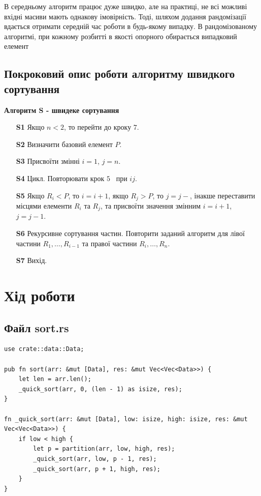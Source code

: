 \documentclass{article}
\begin{document}
\begin{normalsize}
		В середньому алгоритм працює дуже швидко, але на практиці, не всі можливі вхідні масиви мають однакову імовірність. Тоді, шляхом додання рандомізації вдається отримати середній час роботи в будь-якому випадку. В рандомізованому алгоритмі, при кожному розбитті в якості опорного обирається випадковий елемент
		
		\subsection*{Покроковий опис роботи алгоритму швидкого сортування}
		\textbf{Алгоритм S - швидеке сортування}
		\begin{enumerate}
			\item [\textbf{S1}] Якщо $n < 2$, то перейти до кроку $7$.
			\item [\textbf{S2}] Визначити базовий елемент $P$.
			\item [\textbf{S3}] Присвоїти змінні $i=1$, $j=n$.
			\item [\textbf{S4}] Цикл. Повторювати крок $5$  при $ij$.
			\item [\textbf{S5}] Якщо $R_i<P$, то $i=i+1$, якщо $R_j>P$, то $j=j-$, інакше переставити місцями елементи $R_i$ та $R_j$, та присвоїти значення змінним $i=i+1$, $j=j-1$.
			\item [\textbf{S6}] Рекурсивне сортування частин. Повторити заданий алгоритм для лівої частини $R_1,…,R_{i-1}$ та правої частини $R_i,…, R_n$.
			\item [\textbf{S7}] Вихід.
		\end{enumerate}
		
		\newpage
		
		\section*{Хід роботи}
		\subsection*{Файл sort.rs}
		\begin{lstlisting}
use crate::data::Data;

pub fn sort(arr: &mut [Data], res: &mut Vec<Vec<Data>>) {
	let len = arr.len();
	_quick_sort(arr, 0, (len - 1) as isize, res);
}

fn _quick_sort(arr: &mut [Data], low: isize, high: isize, res: &mut Vec<Vec<Data>>) {
	if low < high {
		let p = partition(arr, low, high, res);
		_quick_sort(arr, low, p - 1, res);
		_quick_sort(arr, p + 1, high, res);
	}
}


\end{lstlisting}
\end{normalsize}
\end{document}
